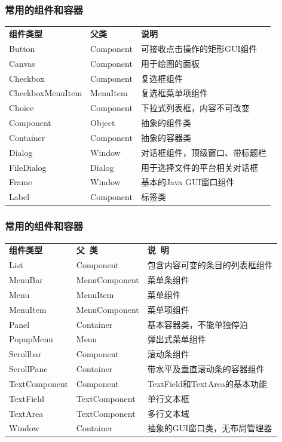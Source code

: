 \documentclass[compress,table]{beamer} %
\begin{document}
\begin{frame}[fragile] %
\frametitle{常用的组件和容器 }

\begin{table}
\scriptsize
\setlength{\extrarowheight}{1.2mm}
\begin{tabular}{lll}
{\bf 组件类型} & {\bf 父类}  & {\bf 说明}\\
Button & Component & 可接收点击操作的矩形GUI组件\\
Canvas & Component & 用于绘图的面板\\
Checkbox & Component & 复选框组件\\
CheckboxMenuItem & MenuItem & 复选框菜单项组件\\
Choice & Component & 下拉式列表框，内容不可改变\\
Component & Object & 抽象的组件类\\
Container & Component & 抽象的容器类\\
Dialog & Window & 对话框组件，顶级窗口、带标题栏\\
FileDialog & Dialog & 用于选择文件的平台相关对话框\\
Frame & Window & 基本的Java GUI窗口组件\\
Label & Component & 标签类\\
\end{tabular}
\end{table}
\end{frame}

\begin{frame}[fragile] %
\frametitle{常用的组件和容器 }

\begin{table}
\scriptsize
\setlength{\extrarowheight}{1.2mm}
\begin{tabular}{lll}
{\bf 组件类型} & {\bf 父~类}  & {\bf 说~明}\\
List & Component & 包含内容可变的条目的列表框组件\\
MenuBar & MenuComponent & 菜单条组件\\
Menu & MenuItem & 菜单组件\\
MenuItem & MenuComponent & 菜单项组件\\
Panel & Container & 基本容器类，不能单独停泊\\
PopupMenu & Menu & 弹出式菜单组件\\
Scrollbar & Component & 滚动条组件\\
ScrollPane & Container & 带水平及垂直滚动条的容器组件\\
TextComponent & Component & TextField和TextArea的基本功能\\
TextField & TextComponent & 单行文本框\\
TextArea & TextComponent & 多行文本域\\
Window & Container & 抽象的GUI窗口类，无布局管理器\\
\end{tabular}
\end{table}
\end{frame}
\end{document}
